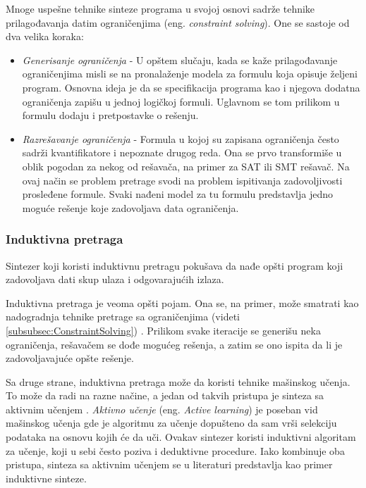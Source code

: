 Mnoge uspešne tehnike sinteze programa u svojoj osnovi sadrže tehnike prilagođavanja datim ograničenjima (eng. \emph{constraint solving}). One se sastoje od dva velika koraka:
\begin{itemize}
    \item \emph{Generisanje ograničenja} - U opštem slučaju, kada se kaže pri\-la\-go\-đa\-va\-nje ograničenjima misli se na pronalaženje modela za formulu koja opisuje željeni program. Osnovna ideja je da se specifikacija programa kao i njegova dodatna ograničenja zapišu u jednoj logičkoj formuli. Uglavnom se tom prilikom u formulu dodaju i pretpostavke o rešenju.
    \item \emph{Razrešavanje ograničenja} - Formula u kojoj su zapisana ograničenja često sadrži kvantifikatore i nepoznate drugog reda. Ona se prvo transformiše u oblik pogodan za nekog od rešavača, na primer za SAT ili SMT rešavač. Na ovaj način se problem pretrage svodi na problem ispitivanja zadovoljivosti prosleđene formule. Svaki nađeni model za tu formulu predstavlja jedno moguće rešenje koje zadovoljava data ograničenja.
\end{itemize}


\subsubsection{Induktivna pretraga}
\label{subsubsec:Induktivna}

Sintezer koji koristi induktivnu pretragu pokušava da nađe opšti program koji zadovoljava dati skup ulaza i odgovarajućih izlaza.

Induktivna pretraga je veoma opšti pojam. Ona se, na primer, može smatrati kao nadogradnja tehnike pretrage sa ograničenjima (videti \ref{subsubsec:ConstraintSolving}) \cite{SGS}. Prilikom svake iteracije se generišu neka ograničenja, rešavačem se dođe mogućeg rešenja, a zatim se ono ispita da li je zadovoljavajuće opšte rešenje.

Sa druge strane, induktivna pretraga može da koristi tehnike mašinskog učenja. To može da radi na razne načine, a jedan od takvih pristupa je sinteza sa aktivnim učenjem \cite{SGS}. \emph{Aktivno učenje} (eng. \emph{Active learning}) je poseban vid mašinskog učenja gde je algoritmu za učenje dopušteno da sam vrši selekciju podataka na osnovu kojih će da uči. Ovakav sintezer koristi induktivni algoritam za učenje, koji u sebi često poziva i deduktivne procedure. Iako kombinuje oba pristupa, sinteza sa aktivnim učenjem se u literaturi predstavlja kao primer induktivne sinteze.

